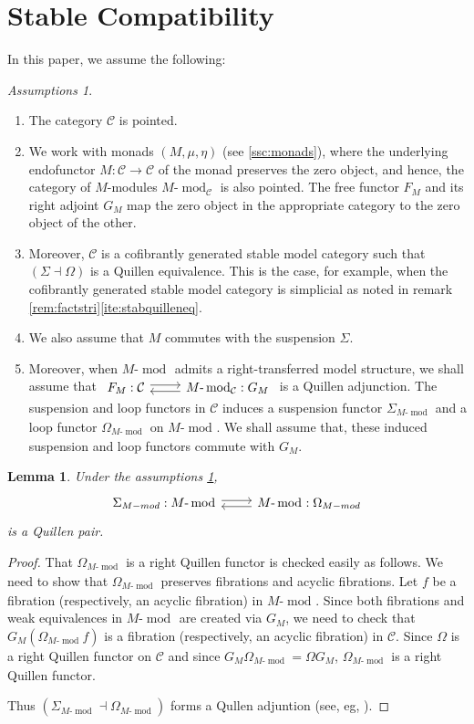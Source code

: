 \documentclass{article}
\newcommand{\cC}{\mathcal{C}}
\newcommand{\adjunction}[4]{\begin{tikzcd}[ampersand replacement=\&] #1 : #2 \arrow[r, shift left] \& #3 : #4 \arrow[l, shift left] \end{tikzcd}}
\newcommand{\module}[2][]{#2\text{-}\modop_{#1}}
\DeclareMathOperator{\modop}{mod}
\newtheorem{lemma}[theorem]{Lemma}
\theoremstyle{definition}
\theoremstyle{remark}
\newtheorem{assumption}[theorem]{Assumptions}
\begin{document}
\section{Stable Compatibility} \label{sec:stablecpt}
In this paper, we assume the following:
\begin{assumption} \label{asm:stabcomp}
    \begin{enumerate}
        \item The category $\cC$ is pointed.
        \item We work with monads $(M, \mu, \eta)$ (see \ref{ssc:monads}), where the underlying endofunctor $M: \cC \rightarrow \cC$ of the monad preserves the zero object, and hence, the category of $M$-modules $\module[\cC]{M}$ is also pointed. The free functor $F_M$ and its right adjoint $G_M$ map the zero object in the appropriate category to the zero object
        of the other.
        \item \label{itm:suslooqe} Moreover, $\cC$ is a cofibrantly generated stable model category such that $(\Sigma \dashv \Omega)$ is a Quillen equivalence. This is the case, for example, when the cofibrantly generated stable model category is simplicial as noted in remark \ref{rem:factstri}\eqref{ite:stabquilleneq}.
        \item \label{itm:suscomGM} We also assume that $M$ commutes with the suspension $\Sigma$.
        \item \label{itm:rtmodstr} Moreover, when $\module{M}$ admits a right-transferred model structure, we shall assume that 
        $\adjunction{F_M}{\cC}{\module[\cC]{M}}{G_M}$ is a Quillen adjunction. The suspension and loop functors
        in $\cC$ induces a suspension functor $\Sigma_{\module{M}}$ and a loop functor $\Omega_{\module{M}}$ on $\module{M}$.
        We shall assume that, these induced suspension and loop functors commute with $G_M$.
    \end{enumerate}
\end{assumption} 

\begin{lemma}
    Under the assumptions \ref{asm:stabcomp}, 
    \[
      \adjunction{\Sigma_{M-mod}}{\module{M}}{\module{M}}{\Omega_{M-mod}}
    \]
    is a Quillen pair.
\end{lemma}
 \begin{proof}
     That $\Omega_{\module{M}}$ is a right Quillen functor is checked easily as follows. 
     We need to show that $\Omega_{\module{M}}$ preserves fibrations and acyclic fibrations.
     Let $f$ be a fibration (respectively, an acyclic fibration) in $\module{M}$. 
     Since both fibrations and weak equivalences in $\module{M}$ are created via $G_M$, 
     we need to check that $G_{M}(\Omega_{\module{M}}f)$ is a fibration (respectively, an acyclic fibration)
     in $\cC$. Since  $\Omega$ is a right Quillen functor on $\cC$ and since $G_{M}\Omega_{\module{M}}=\Omega G_{M}$, 
     $\Omega_{\module{M}} $ is a right Quillen functor. 
     
     Thus $(\Sigma_{\module{M}} \dashv \Omega_{\module{M}})$ forms a Qullen adjuntion (see, eg,
     \cite[lemma 1.3.4]{MR1650134}).
 \end{proof}
\end{document}
